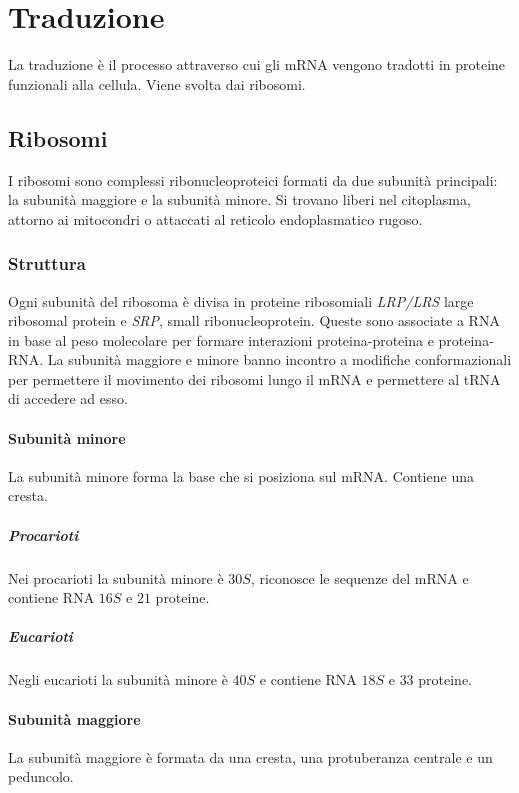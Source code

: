 \chapter{Traduzione}
La traduzione \`e il processo attraverso cui gli mRNA vengono tradotti in proteine funzionali alla cellula.
Viene svolta dai ribosomi.

\section{Ribosomi}
I ribosomi sono complessi ribonucleoproteici formati da due subunit\`a principali: la subunit\`a maggiore e la subunit\`a minore.
Si trovano liberi nel citoplasma, attorno ai mitocondri o attaccati al reticolo endoplasmatico rugoso.

	\subsection{Struttura}
	Ogni subunit\`a del ribosoma \`e divisa in proteine ribosomiali \emph{LRP/LRS} large ribosomal protein e \emph{SRP}, small ribonucleoprotein.
	Queste sono associate a RNA in base al peso molecolare per formare interazioni proteina-proteina e proteina-RNA.
	La subunit\`a maggiore e minore banno incontro a modifiche conformazionali per permettere il movimento dei ribosomi lungo il mRNA e permettere al tRNA di accedere ad esso.

		\subsubsection{Subunit\`a minore}
		La subunit\`a minore forma la base che si posiziona sul mRNA.
		Contiene una cresta.
		
			\paragraph{Procarioti}
			Nei procarioti la subunit\`a minore \`e $30S$, riconosce le sequenze del mRNA e contiene RNA $16S$ e $21$ proteine.

			\paragraph{Eucarioti}
			Negli eucarioti la subunit\`a minore \`e $40S$ e contiene RNA $18S$ e $33$ proteine.

		\subsubsection{Subunit\`a maggiore}
		La subunit\`a maggiore \`e formata da una cresta, una protuberanza centrale e un peduncolo.
			
